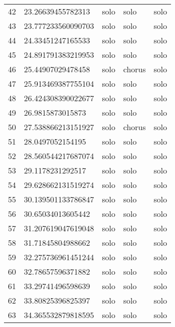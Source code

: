 \begin{table}[]
\begin{tabular}{lllll}
    42   & 23.26639455782313  & solo         & solo            & solo           \\
    43   & 23.777233560090703 & solo         & solo            & solo           \\
    44   & 24.33451247165533  & solo         & solo            & solo           \\
    45   & 24.891791383219953 & solo         & solo            & solo           \\
    46   & 25.44907029478458  & solo         & chorus          & solo           \\
    47   & 25.913469387755104 & solo         & solo            & solo           \\
    48   & 26.424308390022677 & solo         & solo            & solo           \\
    49   & 26.9815873015873   & solo         & solo            & solo           \\
    50   & 27.538866213151927 & solo         & chorus          & solo           \\
    51   & 28.0497052154195   & solo         & solo            & solo           \\
    52   & 28.560544217687074 & solo         & solo            & solo           \\
    53   & 29.1178231292517   & solo         & solo            & solo           \\
    54   & 29.628662131519274 & solo         & solo            & solo           \\
    55   & 30.139501133786847 & solo         & solo            & solo           \\
    56   & 30.65034013605442  & solo         & solo            & solo           \\
    57   & 31.207619047619048 & solo         & solo            & solo           \\
    58   & 31.71845804988662  & solo         & solo            & solo           \\
    59   & 32.275736961451244 & solo         & solo            & solo           \\
    60   & 32.78657596371882  & solo         & solo            & solo           \\
    61   & 33.29741496598639  & solo         & solo            & solo           \\
    62   & 33.80825396825397  & solo         & solo            & solo           \\
    63   & 34.365532879818595 & solo         & solo            & solo           \\

\end{tabular}
\end{table}
